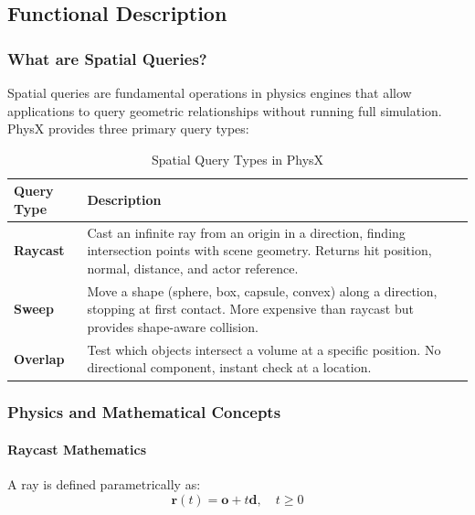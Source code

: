 
\subsection{Functional Description}

\subsubsection{What are Spatial Queries?}

Spatial queries are fundamental operations in physics engines that allow applications to query geometric relationships without running full simulation. PhysX provides three primary query types:

\begin{table}[h]
\centering
\begin{tabular}{|l|p{10cm}|}
\hline
\textbf{Query Type} & \textbf{Description} \\
\hline
\textbf{Raycast} & Cast an infinite ray from an origin in a direction, finding intersection points with scene geometry. Returns hit position, normal, distance, and actor reference. \\
\hline
\textbf{Sweep} & Move a shape (sphere, box, capsule, convex) along a direction, stopping at first contact. More expensive than raycast but provides shape-aware collision. \\
\hline
\textbf{Overlap} & Test which objects intersect a volume at a specific position. No directional component, instant check at a location. \\
\hline
\end{tabular}
\caption{Spatial Query Types in PhysX}
\end{table}

\subsubsection{Physics and Mathematical Concepts}

\paragraph{Raycast Mathematics}

A ray is defined parametrically as:
\begin{equation}
\mathbf{r}(t) = \mathbf{o} + t\mathbf{d}, \quad t \geq 0
\end{equation}

